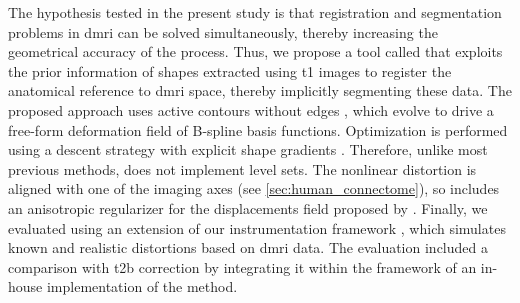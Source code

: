 The hypothesis tested in the present study is that registration and segmentation
  problems in \gls*{dmri} can be solved simultaneously, thereby increasing the geometrical
  accuracy of the process.
Thus, we propose a tool called \regseg{} that exploits the prior information of shapes
  extracted using \gls*{t1} images to register the anatomical reference
  to \gls*{dmri} space, thereby implicitly segmenting these data.
The proposed approach uses active contours without edges \citep{chan_active_2001}, which evolve to drive a
  free-form deformation field of B-spline basis functions.
Optimization is performed using a descent strategy with explicit shape gradients
  \citep{besson_dream2s_2003,herbulot_segmentation_2006}.
Therefore, unlike most previous methods, \regseg{} does not implement level sets.
The nonlinear distortion is aligned with one of the imaging axes (see
  \autoref{sec:human_connectome}), so \regseg{} includes an anisotropic regularizer for
  the displacements field proposed by \cite{nagel_investigation_1986}.
Finally, we evaluated \regseg{} using an extension of our instrumentation framework
  \citep{esteban_simulationbased_2014}, which simulates known and realistic distortions
  based on \gls*{dmri} data.
The evaluation included a comparison with \gls*{t2b} correction by integrating it within the framework
  of an in-house implementation of the method.
